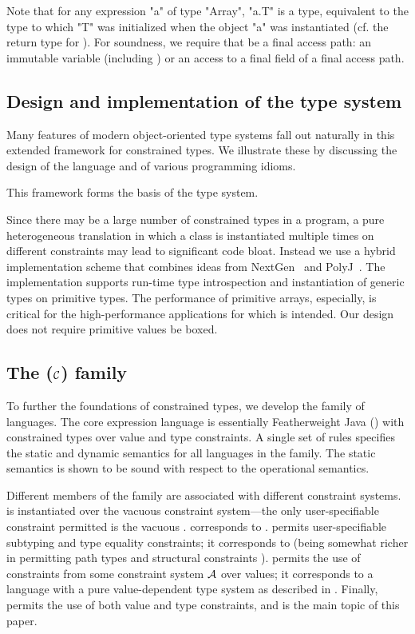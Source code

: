 Note that for any expression \xcd"a" of type \xcd"Array", \xcd"a.T" is
a type, equivalent to the type to which \xcd"T" was initialized when
the object \xcd"a" was instantiated
(cf. the return type  for ).
For soundness, we require
that  be a final access path: an immutable
variable (including ) or an access to a final field of a final access
path.

\subsection{Design and implementation of the \Xten{} type system}

Many features of modern object-oriented type systems fall out
naturally in this extended framework for constrained types.
%
We illustrate these by discussing the design of
the \Xten{} language and of various
programming idioms.

This framework forms the basis of the \Xten type system.

Since there may be a large number of constrained types
in a program, a pure heterogeneous translation
in which a class is instantiated multiple times on different
constraints
may lead to significant
code bloat. Instead we use a hybrid implementation scheme that
combines ideas from NextGen~\cite{nextgen,allen03,allen04} and
PolyJ~\cite{java-popl97}. The implementation supports run-time type
introspection and instantiation of generic types on primitive types.
The performance of primitive arrays, especially, is critical for the
high-performance applications for which \Xten{} is intended.  Our
design does not require primitive values be boxed.

\subsection{The \FX($\cal C$) family}
To further the foundations of constrained types, we develop the \FX{}
family of languages. The core expression language is essentially
Featherweight Java (\FJ \cite{FJ}) with constrained types over
value and type constraints.
A single set of rules specifies the static and dynamic
semantics for all languages in the family.  The static semantics is
shown to be sound with respect to the operational semantics.

Different members of the family are associated with different
constraint systems. \FXZ{} is
\FX{} instantiated over the vacuous constraint system---the only
user-specifiable constraint permitted is the vacuous . \FXZ{}
corresponds to \FJ. \FXG{} permits user-specifiable subtyping
and type equality constraints; it corresponds to
\FGJ{} (being somewhat richer in permitting path types and
structural constraints ). \FXD{} permits
the use of constraints from some constraint system $\cal A$ over
values; it
corresponds to a language with a pure value-dependent type system as
described in \cite{constrained-types}. Finally, \FXGD{} permits the
use of both value and type constraints,
and is the main topic of this paper.


